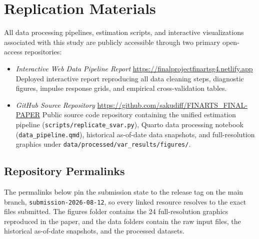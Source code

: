 \section{Replication Materials}

\newcommand{\plurl}[1]{\textcolor{chi45}{\urlstyle{tt}\url{#1}}}
\newcommand{\plink}[2]{\textcolor{chi45}{\href{#1}{\underline{#2}}}}
\newcommand{\plref}[2]{\textcolor{chi45}{\hyperref[#1]{\underline{#2}}}}


All data processing pipelines, estimation scripts, and interactive visualizations associated with this study are publicly accessible through two primary open-access repositories:

\sloppy
\begin{itemize}
    \item \textit{Interactive Web Data Pipeline Report}
\newline \plurl{https://finalprojectfinartsg4.netlify.app}
\newline Deployed interactive report reproducing all data cleaning steps, diagnostic figures, impulse response grids, and empirical cross-validation tables.

    \item \textit{GitHub Source Repository}
\newline \plurl{https://github.com/sakudiff/FINARTS_FINAL-PAPER}
\newline Public source code repository containing the unified estimation pipeline (\texttt{scripts/replicate\_\-svar.py}), Quarto data processing notebook (\texttt{data\_pipeline.qmd}), historical as-of-date data snapshots, and full-resolution graphics under \texttt{data/processed/var\_results/figures/}.
\end{itemize}
\fussy

\FloatBarrier

\subsection{Repository Permalinks}

The permalinks below pin the submission state to the release tag on the main branch, \texttt{submission-2026-08-12}, so every linked resource resolves to the exact files submitted. The figures folder contains the 24 full-resolution graphics reproduced in the paper, and the data folders contain the raw input files, the historical as-of-date snapshots, and the processed datasets.

